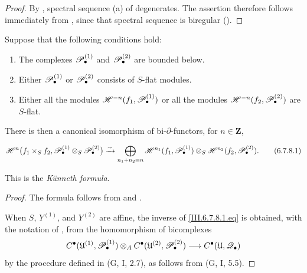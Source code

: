 \begin{proof}
By , spectral sequence \textnormal{(a)} of
 degenerates.  The assertion therefore follows
immediately from , since that spectral sequence
is biregular ().
\end{proof}

\begin{theorem}[6.7.8]
\label{III.6.7.8}
Suppose that the following conditions hold:
\begin{enumerate}
  \item[{$1^\circ$}]
    The complexes $\mathscr{P}_\bullet^{(1)}$ and
    $\mathscr{P}_\bullet^{(2)}$ are bounded below.
  \item[{$2^\circ$}]
    Either $\mathscr{P}_\bullet^{(1)}$ or
    $\mathscr{P}_\bullet^{(2)}$ consists of $S$-flat modules.


  \item[{$3^\circ$}]
    Either all the modules
    $\mathscr{H}^{-n}(f_1,\mathscr{P}_\bullet^{(1)})$ or all the modules
    $\mathscr{H}^{-n}(f_2,\mathscr{P}_\bullet^{(2)})$ are $S$-flat.
\end{enumerate}
There is then a canonical isomorphism of bi-$\partial$-functors,
for $n\in\mathbf Z$,
\begin{env}[6.7.8.1]
\label{III.6.7.8.1}
\[
  \sh H^n
  \bigl(
    f_1\times_Sf_2,
    \sh P_\bullet^{(1)}\otimes_S\sh P_\bullet^{(2)}
  \bigr)
  \xrightarrow{\sim}
  \bigoplus_{n_1+n_2=n}
  \sh H^{n_1}(f_1,\sh P_\bullet^{(1)})
  \otimes_S
  \sh H^{n_2}(f_2,\sh P_\bullet^{(2)}).
  \tag{6.7.8.1}\label{III.6.7.8.1.eq}
\]
\end{env}
This is the \emph{K\"unneth formula}.
\end{theorem}

\begin{proof}
The formula follows from  and
.

When $S$, $Y^{(1)}$, and $Y^{(2)}$ are affine, the inverse of
\eqref{III.6.7.8.1.eq} is obtained, with the notation of
, from the homomorphism of bicomplexes
\[
  C^\bullet(\mathfrak U^{(1)},\mathscr{P}_\bullet^{(1)})
  \otimes_A
  C^\bullet(\mathfrak U^{(2)},\mathscr{P}_\bullet^{(2)})
  \longrightarrow
  C^\bullet(\mathfrak U,\mathscr{Q}_\bullet)
\]
by the procedure defined in \textnormal{(G, I, 2.7)}, as follows
from \textnormal{(G, I, 5.5)}.
\end{proof}

